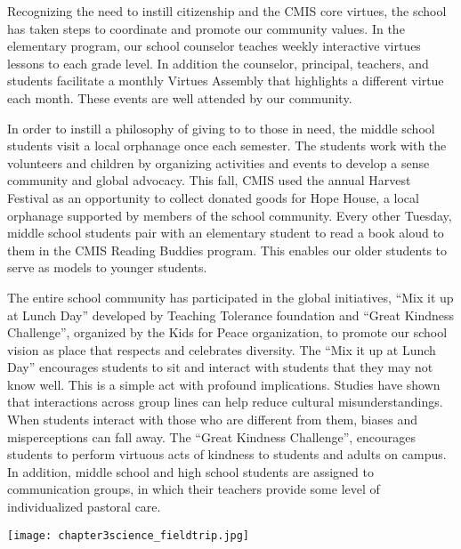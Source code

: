 Recognizing the need to instill citizenship and the CMIS core virtues, the school has taken steps to coordinate and promote our community values.  In the elementary program, our school counselor teaches weekly interactive virtues lessons to each grade level.  In addition the counselor, principal, teachers, and students facilitate a monthly Virtues Assembly that highlights a different virtue each month. These events are well attended by our community.

In order to instill a philosophy of giving to to those in need, the middle school students visit a local orphanage once each semester.  The students work with the volunteers and children by organizing activities and events to develop a sense community and global advocacy.  This fall, CMIS used the annual Harvest Festival as an opportunity to collect donated goods for Hope House, a local orphanage supported by members of the school community.  Every other Tuesday, middle school students pair with an elementary student to read a book aloud to them in the CMIS Reading Buddies program.  This enables our older students to serve as models to younger students.  

The entire school community has participated in the global initiatives, “Mix it up at Lunch Day” developed by Teaching Tolerance foundation and “Great Kindness Challenge”, organized by the Kids for Peace organization, to promote our school vision as place that respects and celebrates diversity. The “Mix it up at Lunch Day” encourages students to sit and interact with students that they may not know well. This is a simple act with profound implications. Studies have shown that interactions across group lines can help reduce cultural misunderstandings. When students interact with those who are different from them, biases and misperceptions can fall away.  The “Great Kindness Challenge”, encourages students to perform virtuous acts of kindness to students and adults on campus. In addition, middle school and high school students are assigned to communication groups, in which their teachers provide some level of individualized pastoral care.  

{\centering\texttt{[image: chapter3science\_fieldtrip.jpg]}}

